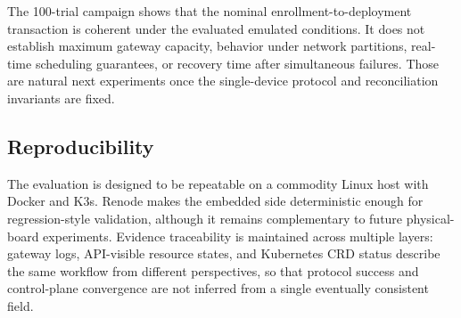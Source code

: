 
 The 100-trial campaign shows that the nominal enrollment-to-deployment transaction is coherent under the evaluated emulated conditions. It does not establish maximum gateway capacity, behavior under network partitions, real-time scheduling guarantees, or recovery time after simultaneous failures. Those are natural next experiments once the single-device protocol and reconciliation invariants are fixed.
\endgroup

\subsection{Reproducibility}
The evaluation is designed to be repeatable on a commodity Linux host with Docker and K3s. Renode makes the embedded side deterministic enough for regression-style validation, although it remains complementary to future physical-board experiments. Evidence traceability is maintained across multiple layers: gateway logs, API-visible resource states, and Kubernetes CRD status describe the same workflow from different perspectives, so that protocol success and control-plane convergence are not inferred from a single eventually consistent field.

